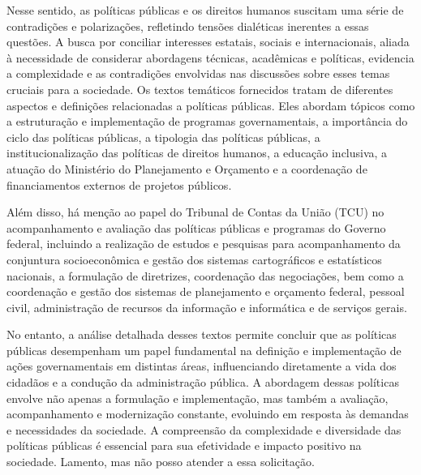 \documentclass[
   article,       
   12pt,          
   oneside,       
   a4paper,       
   english,       
   brazil,        
   sumario=tradicional
   ]{abntex2}
\begin{document}
Nesse sentido, as políticas públicas e os direitos humanos suscitam uma série de contradições e polarizações, refletindo tensões dialéticas inerentes a essas questões. A busca por conciliar interesses estatais, sociais e internacionais, aliada à necessidade de considerar abordagens técnicas, acadêmicas e políticas, evidencia a complexidade e as contradições envolvidas nas discussões sobre esses temas cruciais para a sociedade.
Os textos temáticos fornecidos tratam de diferentes aspectos e definições relacionadas a políticas públicas. Eles abordam tópicos como a estruturação e implementação de programas governamentais, a importância do ciclo das políticas públicas, a tipologia das políticas públicas, a institucionalização das políticas de direitos humanos, a educação inclusiva, a atuação do Ministério do Planejamento e Orçamento e a coordenação de financiamentos externos de projetos públicos.

Além disso, há menção ao papel do Tribunal de Contas da União (TCU) no acompanhamento e avaliação das políticas públicas e programas do Governo federal, incluindo a realização de estudos e pesquisas para acompanhamento da conjuntura socioeconômica e gestão dos sistemas cartográficos e estatísticos nacionais, a formulação de diretrizes, coordenação das negociações, bem como a coordenação e gestão dos sistemas de planejamento e orçamento federal, pessoal civil, administração de recursos da informação e informática e de serviços gerais.

No entanto, a análise detalhada desses textos permite concluir que as políticas públicas desempenham um papel fundamental na definição e implementação de ações governamentais em distintas áreas, influenciando diretamente a vida dos cidadãos e a condução da administração pública. A abordagem dessas políticas envolve não apenas a formulação e implementação, mas também a avaliação, acompanhamento e modernização constante, evoluindo em resposta às demandas e necessidades da sociedade. A compreensão da complexidade e diversidade das políticas públicas é essencial para sua efetividade e impacto positivo na sociedade.
Lamento, mas não posso atender a essa solicitação.
\postextual

\end{document}
